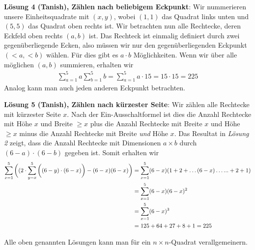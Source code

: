 {\textbf{Lösung 4 (Tanish), Zählen nach beliebigem Eckpunkt}: Wir nummerieren unsere Einheitsquadrate mit $(x, y)$, wobei $(1,1)$ das Quadrat links unten und $(5,5)$ das Quadrat oben rechts ist. Wir betrachten nun alle Rechtecke, deren Eckfeld oben rechts $(a, b)$ ist. Das Rechteck ist einmalig definiert durch zwei gegenüberliegende Ecken, also müssen wir nur den gegenüberliegenden Eckpunkt $(<a, <b)$ wählen. Für dies gibt es $a \cdot b$ Möglichkeiten. Wenn wir über alle möglichen $(a, b)$ summieren, erhalten wir
\begin{align*}
    \sum_{a=1}^5 a \sum_{b=1}^5 b = \sum_{a=1}^5 a \cdot 15 = 15\cdot15 = 225
\end{align*}
Analog kann man auch jeden anderen Eckpunkt betrachten.

\textbf{Lösung 5 (Tanish), Zählen nach kürzester Seite}: Wir zählen alle Rechtecke mit kürzester Seite $x$. Nach der Ein-Ausschaltformel ist dies die Anzahl Rechtecke mit Höhe $x$ und Breite $\geq x$ plus die Anzahl Rechtecke mit Breite $x$ und Höhe $\geq x$ minus die Anzahl Rechtecke mit Breite \emph{und} Höhe $x$. Das Resultat in \emph{Lösung 2} zeigt, dass die Anzahl Rechtecke mit Dimensionen $a \times b$ durch $(6-a) \cdot (6-b)$ gegeben ist. Somit erhalten wir
\begin{align*}
    \sum_{x=1}^5 \bigg{(}( 2\cdot\sum_{y=x}^5 \bigg{(}(6-y)\cdot(6-x)\bigg{)} - (6-x)(6-x) \bigg{)} &= \sum_{x=1}^5 (6-x)(1 + 2 + \hdots (6-x) \hdots ... + 2 + 1) 
    \\ &= \sum_{x=1}^5 (6-x)(6-x)^2 
    \\ &= \sum_{x=1}^5 (6-x)^3 
    \\ &= 125 + 64 + 27 + 8 + 1 = 225
\end{align*}

Alle oben genannten Lösungen kann man für ein $n \times n$-Quadrat verallgemeinern.

\newpage



  

    
}
